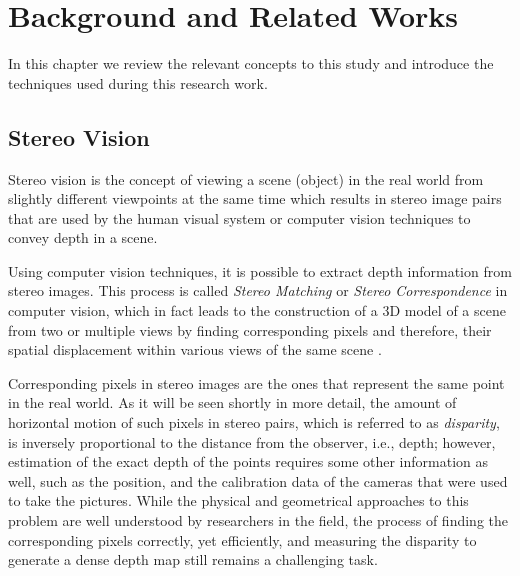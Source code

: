 \chapter{Background and Related Works}
\label{chap:Background}

In this chapter we review the relevant concepts to this study and introduce the techniques used during this research work.

\section{Stereo Vision}

Stereo vision is the concept of viewing a scene (object) in the real world from slightly different
viewpoints at the same time which results in stereo image pairs that are used by the human visual system or computer vision techniques to convey
depth in a scene. 

Using computer vision techniques, it is possible to extract depth information from stereo
images. This process is called {\it Stereo Matching} or {\it Stereo Correspondence} in computer vision,
which in fact leads to the construction of a
3D model of a scene from two or multiple views by finding corresponding pixels and therefore, their spatial displacement within various views of the same scene \cite{sze11}.

Corresponding pixels in stereo images are the ones that represent the same point in the real
world. As it will be seen shortly in more detail, the amount of horizontal motion of such pixels
in stereo pairs, which is referred to as {\it disparity}, is inversely proportional to the
distance from the observer, i.e., depth; however,  estimation of the exact depth of the points requires some
other information as well, such as the position, and the calibration data of the cameras that were used to take the pictures.
While the physical and geometrical approaches to this problem are well understood by researchers in the field, the process of finding the corresponding pixels correctly, 
yet efficiently, and measuring the disparity to generate a dense depth map still remains a challenging task. \newline

